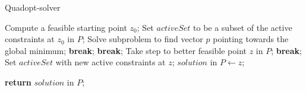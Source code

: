 \begin{algorithm}
\caption{Quadopt-solver}
\begin{algorithmic}
	\State Compute a feasible starting point $z_0$;
\EndIf	
\State Set $activeSet$ to be a subset of the active constraints at $z_0$ in $P$;
	\State Solve subproblem to find vector $p$ pointing towards the global minimum;
			\State \textbf{break};
		\EndIf		
			\State \textbf{break};
		\EndIf
	\Else
		\State Take step to better feasible point $z$ in $P$;
			\State \textbf{break};
		\EndIf
		\State Set $activeSet$ with new active constraints at $z$;	
	\EndIf
\EndWhile
\State  $solution$ in $P\gets z$;

\State \textbf{return} $solution$ in $P$;
	
\EndProcedure
\end{algorithmic}
\end{algorithm}



